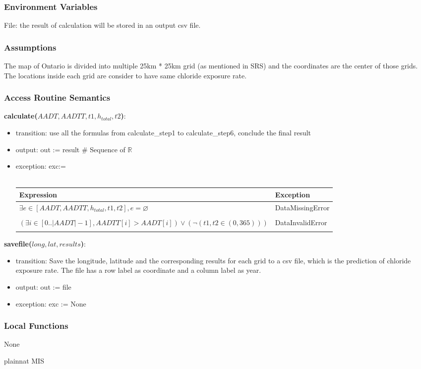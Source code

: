 \documentclass[12pt, titlepage]{article}
\begin{document}
\subsubsection{Environment Variables}
File: the result of calculation will be stored in an output csv file.
\subsubsection{Assumptions}
The map of Ontario is divided into multiple 25km * 25km grid (as mentioned in SRS) and the coordinates are the center of those grids. The locations inside each grid are consider to have same chloride exposure rate.

\subsubsection{Access Routine Semantics}

\noindent \textbf{calculate($AADT, AADTT, t1, h_{total}, t2$)}:
\begin{itemize}
\item transition: use all the formulas from calculate\_step1 to calculate\_step6, conclude the final result
\item output: out := result \# Sequence of $\mathbb{R}$
\item exception: exc:= \\ \\ 
 \begin{tabular}{p{10cm} p{3.5cm} }
 \hline
 \textbf{Expression} & \textbf{Exception}  \\
 \hline
     $\exists e \in [AADT, AADTT, h_{total}, t1, t2], e =\varnothing$ & DataMissingError  \\ \\

  \hline
     $(\exists i \in [0..|AADT|-1], AADTT[i] > AADT[i]) \lor (\neg (t1, t2 \in (0,365)))$   & DataInvalidError \\ \\

  \hline
 \end{tabular}

\end{itemize}


\noindent \textbf{savefile($long, lat, results$)}:
\begin{itemize}
\item transition: Save the longitude, latitude and the corresponding results for each grid to a csv file, which is the prediction of chloride exposure rate. The file has a row label as coordinate and a column label as year. 
\item output: out := file
\item exception: exc := None
\end{itemize}



\subsubsection{Local Functions}

None

\newpage

 {plainnat}
 {MIS}

\newpage
\end{document}
